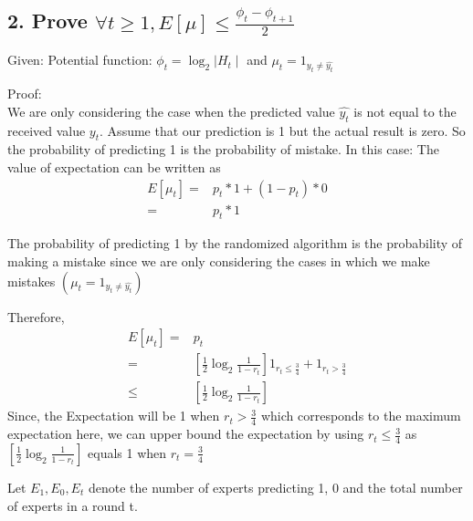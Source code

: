 \documentclass{article}
\begin{document}
\subsection*{2. Prove \( \forall t \geq 1, E[\mu] \le \frac{\phi_{t} - \phi_{t+1}}{2} \)}
\begin{description}
  \item{Given:} Potential function: \( \phi_{t} = \log_2{\mid H_{t} \mid} \) and \( \mu_{t} = 1_{y_{t} \neq \hat{y_{t}} } \)
  \item{Proof:} \\
    We are only considering the case when the predicted value \( \hat{y_{t}} \) is not equal to the received value \( y_{t} \).  Assume that our prediction is 1 but the actual result is zero.  So the probability of predicting 1 is the probability of mistake.  In this case:
    The value of expectation can be written as 
    \begin{align*}
      E[\mu_{t}] =& p_{t}*1 + (1 - p_{t})*0 \\
      =& p_{t}*1
    \end{align*}

    The probability of predicting 1 by the randomized algorithm is the probability of making a mistake since we are only considering the cases in which we make mistakes \(  ( \mu_{t} = 1_{y_{t} \neq \hat{y_{t}}})\)

    Therefore, 
    \begin{align*}
      E[\mu_{t}] =& p_{t}\\
      =& [\frac{1}{2} \log_2{\frac{1}{1 - r_{t}}} ] 1_{r_{t} \le \frac{3}{4}} + 1_{r_{t} > \frac{3}{4}} \\
      \le & [\frac{1}{2} \log_2{\frac{1}{1 - r_{t}}}]
    \end{align*}
    Since, the Expectation will be 1 when \( r_{t} > \frac{3}{4} \) which corresponds to the maximum expectation here, we can upper bound the expectation by using \( r_{t} \le \frac{3}{4} \) as \( [\frac{1}{2} \log_2{\frac{1}{1 - r_{t}}} ] \) equals 1 when \( r_{t} = \frac{3}{4} \)

    Let \( E_{1}, E_{0}, E_{t} \) denote the number of experts predicting 1, 0 and the total number of experts in a round t.


\end{description}
\end{document}
